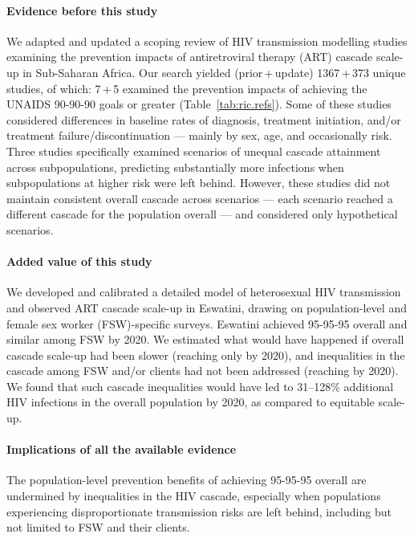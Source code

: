 \newcommand{\pu}[2]{#1\,+\,#2}
\begin{ric}[b]
  \paragraph{Evidence before this study}
  We adapted and updated a scoping review of HIV transmission modelling studies examining
  the prevention impacts of antiretroviral therapy (ART) cascade scale-up in Sub-Saharan Africa.
  Our search yielded (\pu{prior}{update}) \pu{1367}{373} unique studies, of which:
  \pu{7}{5} examined the prevention impacts of achieving
  the UNAIDS 90-90-90 goals or greater (Table~\ref{tab:ric.refs}).
  Some of these studies considered differences in baseline rates of
  diagnosis, treatment initiation, and/or treatment failure/discontinuation
  --- mainly by sex, age, and occasionally risk.
  Three studies specifically examined scenarios of unequal cascade attainment across subpopulations,
  predicting substantially more infections when subpopulations at higher risk were left behind.
  However, these studies did not maintain consistent overall cascade across scenarios
  --- \ie each scenario reached a different cascade for the population overall ---
  and considered only hypothetical scenarios.
  \paragraph{Added value of this study}
  We developed and calibrated a detailed model of heterosexual HIV transmission
  and observed ART cascade scale-up in Eswatini,
  drawing on population-level and female sex worker (FSW)-specific surveys.
  Eswatini achieved 95-95-95 overall and similar among FSW by 2020.
  We estimated what would have happened if
  overall cascade scale-up had been slower
  (reaching only \casmd by 2020), and
  inequalities in the cascade among FSW and/or clients had not been addressed
  (reaching \caslo by 2020).
  We found that such cascade inequalities
  would have led to 31--128\% additional HIV infections in the overall population by 2020, %
  as compared to equitable scale-up.
  \paragraph{Implications of all the available evidence}
  The population-level prevention benefits of achieving 95-95-95 overall
  are undermined by inequalities in the HIV cascade, especially when
  populations experiencing disproportionate transmission risks are left behind,
  including but not limited to FSW and their clients.
\end{ric}
